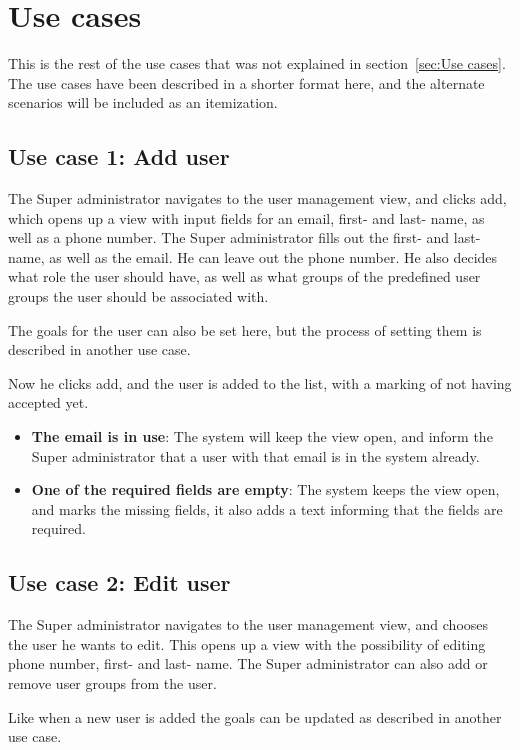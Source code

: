 \chapter{Use cases}
\label{app:Use cases}
This is the rest of the use cases that was not explained in
section~\ref{sec:Use cases}. The use cases have been described in a shorter
format here, and the alternate scenarios will be included as an itemization.

\section{Use case 1: Add user }
The Super administrator navigates to the user management view, and clicks add,
which opens up a view with input fields for an email, first- and last- name, as
well as a phone number. The Super administrator fills out the first- and last-
name, as well as the email. He can leave out the phone number. He also decides
what role the user should have, as well as what groups of the predefined user
groups the user should be associated with. 

The goals for the user can also be set here, but the process of setting them is
described in another use case. 

Now he clicks add, and the user is added to the list, with a marking of not
having accepted yet. 

\begin{itemize}
  \item \textbf{The email is in use}: The system will keep the view open, and
    inform the Super administrator that a user with that email is in the system
    already. 
  \item \textbf{One of the required fields are empty}: The system keeps the view
    open, and marks the missing fields, it also adds a text informing that the
    fields are required. 
\end{itemize}

\section{Use case 2: Edit user }
The Super administrator navigates to the user management view, and chooses the
user he wants to edit. This opens up a view with the possibility of editing
phone number, first- and last- name. The Super administrator can also add or
remove user groups from the user. 

Like when a new user is added the goals can be updated as described in another
use case. 

